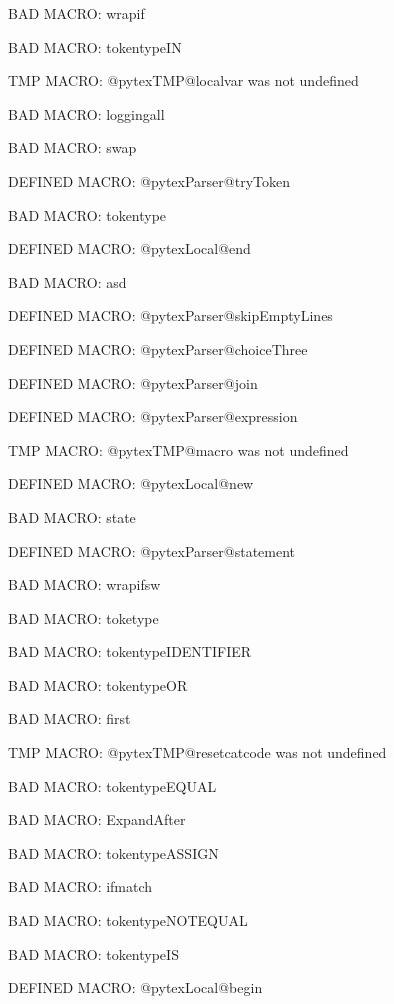 BAD MACRO: wrapif

BAD MACRO: tokentypeIN

\ifx\@pytexTMP@localvar\undefined\else TMP MACRO: @pytexTMP@localvar was not undefined
\fi

BAD MACRO: loggingall

BAD MACRO: swap

\ifx\@pytexParser@tryToken\undefined\else DEFINED MACRO: @pytexParser@tryToken
\fi

BAD MACRO: tokentype

\ifx\@pytexLocal@end\undefined\else DEFINED MACRO: @pytexLocal@end
\fi

BAD MACRO: asd

\ifx\@pytexParser@skipEmptyLines\undefined\else DEFINED MACRO: @pytexParser@skipEmptyLines
\fi

\ifx\@pytexParser@choiceThree\undefined\else DEFINED MACRO: @pytexParser@choiceThree
\fi

\ifx\@pytexParser@join\undefined\else DEFINED MACRO: @pytexParser@join
\fi

\ifx\@pytexParser@expression\undefined\else DEFINED MACRO: @pytexParser@expression
\fi

\ifx\@pytexTMP@macro\undefined\else TMP MACRO: @pytexTMP@macro was not undefined
\fi

\ifx\@pytexLocal@new\undefined\else DEFINED MACRO: @pytexLocal@new
\fi

BAD MACRO: state

\ifx\@pytexParser@statement\undefined\else DEFINED MACRO: @pytexParser@statement
\fi

BAD MACRO: wrapifsw

BAD MACRO: toketype

BAD MACRO: tokentypeIDENTIFIER

BAD MACRO: tokentypeOR

BAD MACRO: first

\ifx\@pytexTMP@resetcatcode\undefined\else TMP MACRO: @pytexTMP@resetcatcode was not undefined
\fi

BAD MACRO: tokentypeEQUAL

BAD MACRO: ExpandAfter

BAD MACRO: tokentypeASSIGN

BAD MACRO: ifmatch

BAD MACRO: tokentypeNOTEQUAL

BAD MACRO: tokentypeIS

\ifx\@pytexLocal@begin\undefined\else DEFINED MACRO: @pytexLocal@begin
\fi

